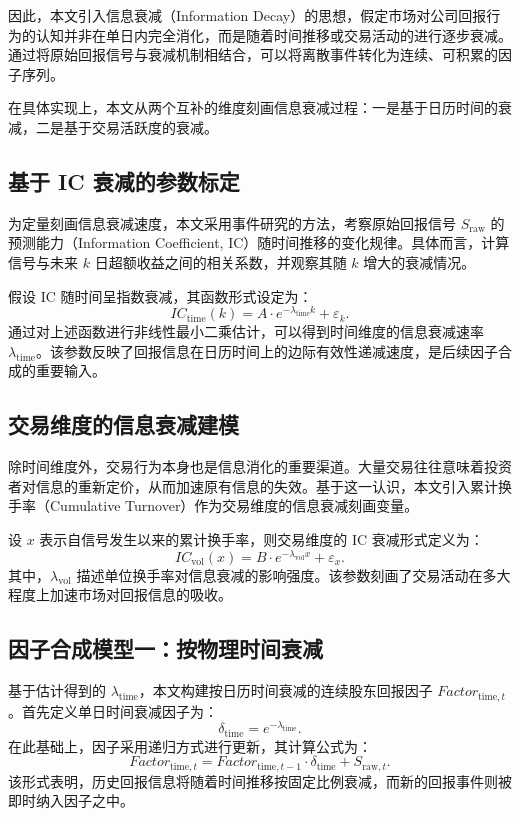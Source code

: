\documentclass[a4paper,10pt]{article}
\begin{document}
因此，本文引入信息衰减（Information Decay）的思想，假定市场对公司回报行为的认知并非在单日内完全消化，而是随着时间推移或交易活动的进行逐步衰减。通过将原始回报信号与衰减机制相结合，可以将离散事件转化为连续、可积累的因子序列。

在具体实现上，本文从两个互补的维度刻画信息衰减过程：一是基于日历时间的衰减，二是基于交易活跃度的衰减。

\subsection{基于 IC 衰减的参数标定}

为定量刻画信息衰减速度，本文采用事件研究的方法，考察原始回报信号 $S_{\text{raw}}$ 的预测能力（Information Coefficient, IC）随时间推移的变化规律。具体而言，计算信号与未来 $k$ 日超额收益之间的相关系数，并观察其随 $k$ 增大的衰减情况。

假设 IC 随时间呈指数衰减，其函数形式设定为：
\begin{equation}
IC_{\text{time}}(k) = A \cdot e^{-\lambda_{\text{time}} k} + \varepsilon_k.
\end{equation}
通过对上述函数进行非线性最小二乘估计，可以得到时间维度的信息衰减速率 $\lambda_{\text{time}}$。该参数反映了回报信息在日历时间上的边际有效性递减速度，是后续因子合成的重要输入。

\subsection{交易维度的信息衰减建模}

除时间维度外，交易行为本身也是信息消化的重要渠道。大量交易往往意味着投资者对信息的重新定价，从而加速原有信息的失效。基于这一认识，本文引入累计换手率（Cumulative Turnover）作为交易维度的信息衰减刻画变量。

设 $x$ 表示自信号发生以来的累计换手率，则交易维度的 IC 衰减形式定义为：
\begin{equation}
IC_{\text{vol}}(x) = B \cdot e^{-\lambda_{\text{vol}} x} + \varepsilon_x.
\end{equation}
其中，$\lambda_{\text{vol}}$ 描述单位换手率对信息衰减的影响强度。该参数刻画了交易活动在多大程度上加速市场对回报信息的吸收。

\subsection{因子合成模型一：按物理时间衰减}

基于估计得到的 $\lambda_{\text{time}}$，本文构建按日历时间衰减的连续股东回报因子 $Factor_{\text{time},t}$。首先定义单日时间衰减因子为：
\begin{equation}
\delta_{\text{time}} = e^{-\lambda_{\text{time}}}.
\end{equation}
在此基础上，因子采用递归方式进行更新，其计算公式为：
\begin{equation}
Factor_{\text{time},t}
=
Factor_{\text{time},t-1} \cdot \delta_{\text{time}}
+
S_{\text{raw},t}.
\end{equation}
该形式表明，历史回报信息将随着时间推移按固定比例衰减，而新的回报事件则被即时纳入因子之中。
\end{document}
